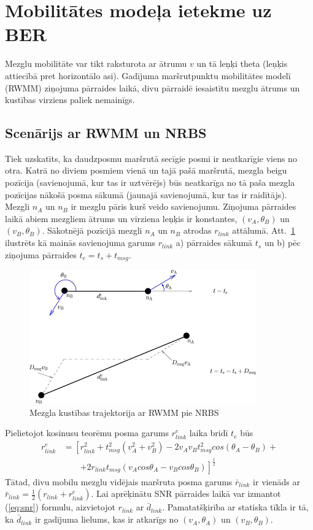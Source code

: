 \section{Mobilitātes modeļa ietekme uz BER}
Mezglu mobilitāte var tikt raksturota ar  ātrumu $v$ un tā leņķi \gls{theta} (leņķis attiecībā pret horizontālo asi). Gadījuma maršrutpunktu mobilitātes modelī (\acs{RWMM}) ziņojuma pārraides laikā, divu pārraidē iesaistītu mezglu ātrums un kustības virziens paliek nemainīgs.
\subsection{Scenārijs ar RWMM un NRBS}
Tiek uzskatīts, ka daudzposmu maršrutā secīgie posmi ir neatkarīgie viens no otra. Katrā no diviem posmiem vienā un tajā pašā maršrutā, mezgla beigu pozīcija (savienojumā, kur tas ir uztvērējs) būs neatkarīga no tā paša mezgla pozīcijas nākošā posma sākumā (jaunajā savienojumā, kur tas ir raidītājs). Mezgli $n_{A}$ un $n_{B}$ ir mezglu pāris kurš veido savienojumu. Ziņojuma pārraides laikā abiem mezgliem ātrums un virziena leņķis ir konstantes, $(v_{A}, \theta_{B})$ un $(v_{B}, \theta_{B})$. Sākotnējā pozīcijā mezgli $n_{A}$ un $n_{B}$ atrodas $r_{link}$ attālumā. Att.~\ref{fig:dp} ilustrēts kā mainās savienojuma garums $r_{link}$ a) pārraides sākumā $t_{s}$ un b) pēc ziņojuma pārraides $t_{e}=t_{s}+t_{msg}$.

\begin{figure}[!htb]
\centering
\includegraphics[scale=0.65]{./graph/dp}
\caption{Mezgla kustības trajektorija ar RWMM pie NRBS \cite{qoS_mobility}}
\label{fig:dp}
\end{figure}
Pielietojot kosinusu teorēmu posma garums $r_{link}^{e}$ laika bridī $t_{e}$ būs
\begin{align}
r_{link}^{e} &= \left[ r_{link}^{2} + t^{2}_{msg}(v^{2}_{A}+v^{2}_{B})-2v_{A}v_{B}t^{2}_{msg}cos(\theta_{A}-\theta_{B})+ \right. \nonumber \\
    &\qquad {}\left.	+2r_{link}t_{msg}(v_{A}cos\theta_{A}-v_{B}cos\theta_{B})\right]^{\frac{1}{2}}
\end{align}
Tātad, divu mobilu mezglu vidējais maršruta posma garums $\bar{r}_{link}$ ir vienāds ar $\bar{r}_{link}=\frac{1}{2}(r_{link}+r_{link}^{e})$. Lai aprēķinātu SNR pārraides laikā var izmantot (\ref{eq:snr}) formulu, aizvietojot $r_{link}$ ar $\bar{d}_{link}$. Pamatatšķirība ar statiska tīkla ir tā, ka $\bar{d}_{link}$ ir gadījuma lielums, kas ir atkarīgs no $(v_{A}, \theta_{A})$ un $(v_{B}, \theta_{B})$.

